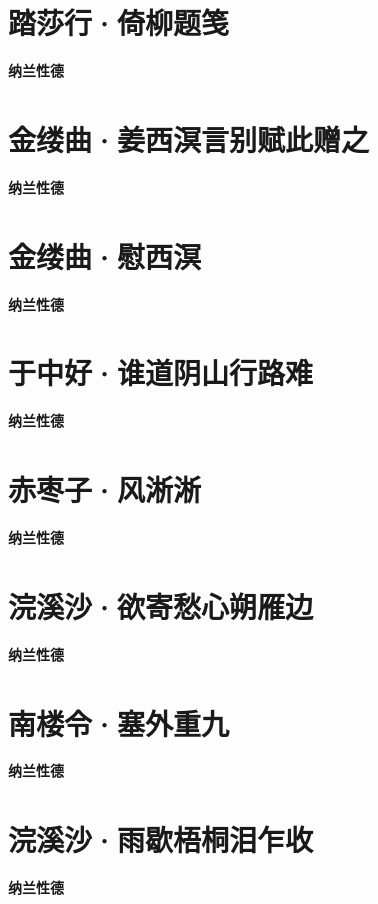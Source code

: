 \documentclass[12pt,a4paper]{ctexbook}
\begin{document}
\section{踏莎行·倚柳题笺}
\textbf{纳兰性德}\par\vspace{0.5em}

\section{金缕曲·姜西溟言别赋此赠之}
\textbf{纳兰性德}\par\vspace{0.5em}

\section{金缕曲·慰西溟}
\textbf{纳兰性德}\par\vspace{0.5em}

\section{于中好·谁道阴山行路难}
\textbf{纳兰性德}\par\vspace{0.5em}

\section{赤枣子·风淅淅}
\textbf{纳兰性德}\par\vspace{0.5em}

\section{浣溪沙·欲寄愁心朔雁边}
\textbf{纳兰性德}\par\vspace{0.5em}

\section{南楼令·塞外重九}
\textbf{纳兰性德}\par\vspace{0.5em}

\section{浣溪沙·雨歇梧桐泪乍收}
\textbf{纳兰性德}\par\vspace{0.5em}
\end{document}
